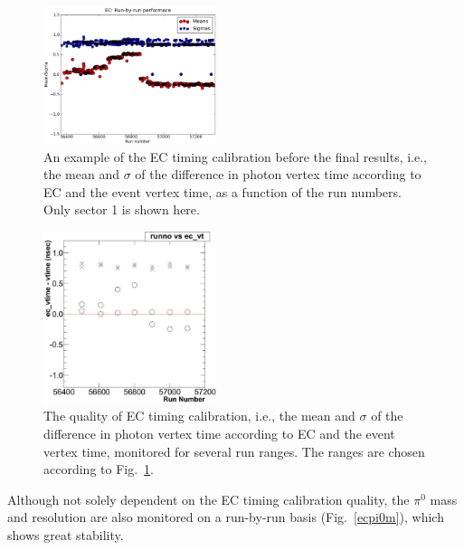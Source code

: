 \begin{figure}[htpb]
\begin{center}
 \includegraphics[width=0.45\textwidth]{figures/calib/ec/ec_vtimebyrunsec.eps}
  \caption{An example of the EC timing calibration before the final results, i.e., the mean and $\sigma$ of the difference in photon vertex time according to EC and the event vertex time, as a function of the run numbers. Only sector 1 is shown here.}
  \label{ectrunsec}
  \end{center}
\end{figure}

\begin{figure}[htpb]
\begin{center}
 \includegraphics[width=0.45\textwidth]{figures/calib/ec/ec_vtimebyrun.eps}
  \caption{The quality of EC timing calibration, i.e., the mean and $\sigma$ of the difference in photon vertex time according to EC and the event vertex time, monitored for several run ranges. The ranges are chosen according to Fig.~\ref{ectrunsec}.}
  \label{ectrun}
  \end{center}
\end{figure}

Although not solely dependent on the EC timing calibration quality, the $\pi^0$ mass and resolution are also monitored on a run-by-run basis (Fig.~\ref{ecpi0m}), which shows great stability.

